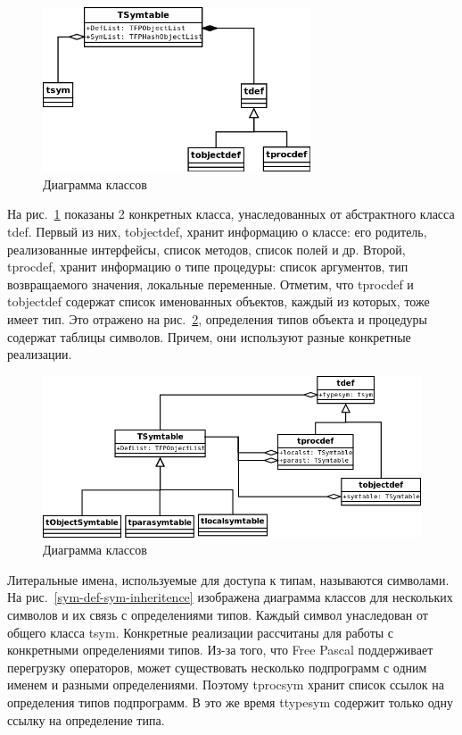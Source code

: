 \documentclass{imcs}
\begin{document}
\begin{figure}[htb]
\centering
\includegraphics[width=300px]{./uml/sym-def-def-inheritence.png}
\caption{Диаграмма классов}
\label{symboltable-sym-def}
\end{figure}

На рис.~\ref{symboltable-sym-def} показаны 2 конкретных класса, унаследованных от
абстрактного класса tdef. Первый из них, tobjectdef, хранит информацию о классе: 
его родитель, реализованные интерфейсы, список методов, список полей и др. Второй, tprocdef, хранит
информацию о типе процедуры: список аргументов, тип возвращаемого значения, локальные
переменные. Отметим, что tprocdef и tobjectdef содержат
список именованных объектов, каждый из которых, тоже имеет тип. Это отражено на
рис.~\ref{symtable-def}, определения типов объекта и процедуры содержат таблицы символов. Причем,
они используют разные конкретные реализации.

\begin{figure}[htb]
\centering
\includegraphics[width=\textwidth]{./uml/symtable-def.png}
\caption{Диаграмма классов}
\label{symtable-def}
\end{figure}

Литеральные имена, используемые для доступа к типам, называются символами. На
рис.~\ref{sym-def-sym-inheritence} изображена диаграмма классов для нескольких символов и 
их связь с определениями типов. Каждый символ унаследован от общего класса tsym. Конкретные
реализации рассчитаны для работы с конкретными определениями типов. 
Из-за того, что Free Pascal поддерживает перегрузку операторов, может существовать несколько
подпрограмм с одним именем и разными определениями. Поэтому tprocsym хранит список ссылок на 
определения типов подпрограмм. В это же время ttypesym содержит только одну ссылку на
определение типа.
\end{document}
